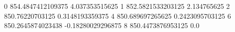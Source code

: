 0 854.4847412109375 4.037353515625
1 852.5821533203125 2.134765625
2 850.76220703125 0.3148193359375
4 850.689697265625 0.2423095703125
6 850.2645874023438 -0.18280029296875
8 850.4473876953125 0.0
